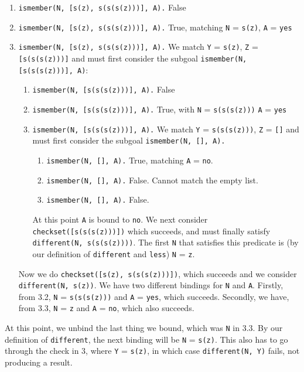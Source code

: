 \documentclass[a4paper]{article}
\newcommand{\pfunc}[1]{\textnormal{\texttt{#1}}\xspace}
\newcommand{\plVar}[1]{\texttt{#1}\xspace}
\newcommand{\code}[1]{\texttt{\scriptsize #1}}
\begin{document}
\begin{description}
\begin{enumerate}\setlength{\itemsep}{-3pt}
\item \code{ismember(N, [s(z), s(s(s(z)))], A).} False
\item \code{ismember(N, [s(z), s(s(s(z)))], A).} True, matching \plVar{N} = \plVar{s(z)}, \plVar{A} = \plVar{yes}
\item \code{ismember(N, [s(z), s(s(s(z)))], A).} We match \plVar{Y} = \plVar{s(z)}, \plVar{Z} = \plVar{[s(s(s(z)))]} and must first consider the subgoal \code{ismember(N, [s(s(s(z)))], A)}:
  \begin{enumerate}[label*=\arabic*.]
    \item \code{ismember(N, [s(s(s(z)))], A).} False
    \item \code{ismember(N, [s(s(s(z)))], A).} True, with \plVar{N} = \plVar{s(s(s(z)))} \plVar{A} = \plVar{yes}
    \item \code{ismember(N, [s(s(s(z)))], A).} We match \plVar{Y} = \plVar{s(s(s(z)))}, \plVar{Z} = \plVar{[]} and must first consider the subgoal \code{ismember(N, [], A).}
      \begin{enumerate}[label*=\arabic*.]
      \item \code{ismember(N, [], A).} True, matching \plVar{A} = \plVar{no}.
      \item \code{ismember(N, [], A).} False. Cannot match the empty list.
      \item \code{ismember(N, [], A).} False.
      \end{enumerate}
      At this point \plVar{A} is bound to \plVar{no}. We next consider \code{checkset([s(s(s(z)))])} which succeeds, and must finally satisfy \code{different(N, s(s(s(z))))}. The first \plVar{N} that satisfies this predicate is (by our definition of \pfunc{different} and \pfunc{less}) \plVar{N} = \plVar{z}.
  \end{enumerate}
  Now we do \code{checkset([s(z), s(s(s(z)))])}, which succeeds and we consider \code{different(N, s(z))}. We have two different bindings for \plVar{N} and \plVar{A}. Firstly, from 3.2, \plVar{N} = \plVar{s(s(s(z)))} and \plVar{A} = \plVar{yes}, which succeeds. Secondly, we have, from 3.3, \plVar{N} = \plVar{z} and \plVar{A} = \plVar{no}, which also succeeds.
\end{enumerate}

At this point, we unbind the last thing we bound, which was \plVar{N} in 3.3. By our definition of \pfunc{different}, the next binding will be \plVar{N} = \plVar{s(z)}. This also has to go through the check in 3, where \plVar{Y} = \plVar{s(z)}, in which case \code{different(N, Y)} fails, not producing a result.


\end{description}
\end{document}
